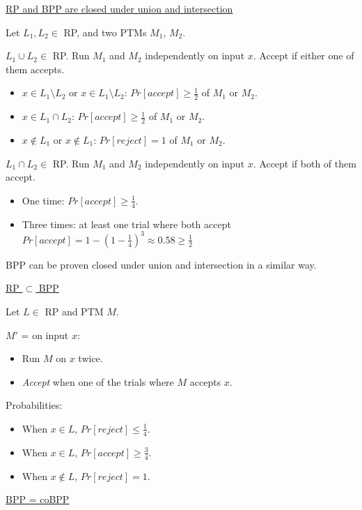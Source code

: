 \documentclass[10pt,landscape,a4paper]{article}
\begin{document}
\begin{multicols*}{3}
\underline{RP and BPP are closed under union and intersection}

Let $L_1, L_2 \in$ RP, and two PTMs $M_1$, $M_2$.

$L_1 \cup L_2 \in$ RP. Run $M_1$ and $M_2$ independently on input $x$. Accept if either one of them accepts.

\begin{itemize}
    \item $x \in L_1 \setminus L_2$ or $x \in L_1 \setminus L_2$: $Pr[accept] \geq \frac{1}{2}$ of $M_1$ or $M_2$.
    \item $x \in L_1 \cap L_2$: $Pr[accept] \geq \frac{1}{2}$ of $M_1$ or $M_2$.
    \item $x \notin L_1$ or $x \notin L_1$: $Pr[reject] = 1$ of $M_1$ or $M_2$.
\end{itemize}

$L_1 \cap L_2 \in$ RP. Run $M_1$ and $M_2$ independently on input $x$. Accept if both of them accept.

\begin{itemize}
    \item One time: $Pr[accept] \geq \frac{1}{4}$.
    \item Three times: at least one trial where both accept $Pr[accept] = 1 - (1-\frac{1}{4})^3 \approx 0.58 \geq \frac{1}{2}$
\end{itemize}

BPP can be proven closed under union and intersection in a similar way.

\underline{RP $\subset$ BPP}

Let $L \in$ RP and PTM $M$.

$M'$ = on input $x$:

\begin{itemize}
    \item Run $M$ on $x$ twice.
    \item \emph{Accept} when one of the trials where $M$ accepts $x$.
\end{itemize}

Probabilities:

\begin{itemize}
    \item When $x \in L$, $Pr[reject] \leq \frac{1}{4}$.
    \item When $x \in L$, $Pr[accept] \geq \frac{3}{4}$.
    \item When $x \notin L$, $Pr[reject] = 1$.
\end{itemize}

\underline{BPP = coBPP}


\end{multicols*}
\end{document}
